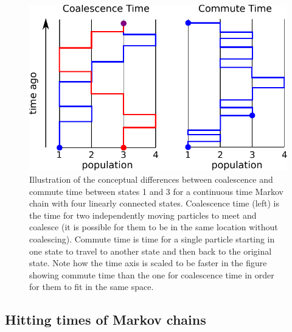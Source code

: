 \documentclass{article}
\begin{document}
\begin{figure}
\centering
     \includegraphics[scale=.5]{figs/conceptn}
    \caption{
    Illustration of the conceptual differences
    between coalescence and commute time between states 1 and 3 
    for a continuous time Markov chain with four linearly connected states. 
    Coalescence time (left) is the time for two independently moving particles to meet and coalesce 
    (it is possible for them to be in the same location without coalescing).
    Commute time is time for a single particle starting in one state to travel to another state 
    and then back to the original state.
    Note how the time axis is scaled to be faster in the figure showing commute time
    than the one for coalescence time in order for them to fit in the same space.
    } \label{fig:concept_coalcom}
\end{figure}


\subsection*{Hitting times of Markov chains}
\end{document}
